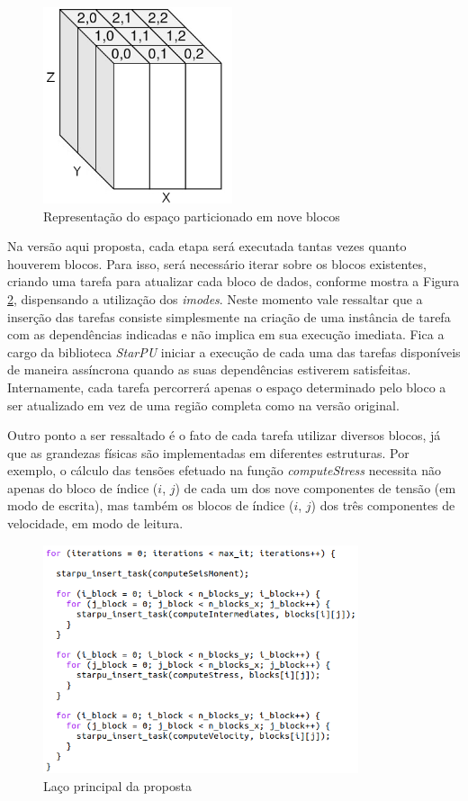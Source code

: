 \documentclass[cic,tc]{iiufrgs}
\begin{document}
\begin{figure}[!htb]
    \caption{Representação do espaço particionado em nove blocos}
    \begin{center}
      \includegraphics[width=15em]{cuboids}
    \end{center}
    \label{fig:cuboids}
\end{figure}

Na versão aqui proposta, cada etapa será executada tantas vezes quanto houverem blocos. Para isso, será necessário iterar sobre os blocos existentes, criando uma tarefa para atualizar cada bloco
de dados, conforme mostra a Figura \ref{fig:new_main_loop}, dispensando a utilização dos \textit{imodes}. Neste momento vale ressaltar que a inserção das tarefas consiste
simplesmente na criação de uma instância de tarefa com as dependências indicadas e não implica em sua execução imediata. Fica a cargo da biblioteca \textit{StarPU} iniciar a execução
de cada uma das tarefas disponíveis de maneira assíncrona quando as suas dependências estiverem satisfeitas. Internamente, cada tarefa percorrerá apenas o espaço determinado pelo bloco a ser
atualizado em vez de uma região completa como na versão original.

Outro ponto a ser ressaltado é o fato de cada tarefa utilizar diversos blocos, já que as grandezas físicas são implementadas em diferentes estruturas. Por exemplo, o cálculo das
tensões efetuado na função \textit{computeStress} necessita não apenas do bloco de índice ($i$, $j$) de cada um dos nove componentes de tensão (em modo de escrita), mas também os blocos de
índice ($i$, $j$) dos três componentes de velocidade, em modo de leitura.

\begin{figure}[!htb]
    \caption{Laço principal da proposta}
    \begin{center}
      \includegraphics[width=25em]{new_main_loop}
    \end{center}
    \label{fig:new_main_loop}
\end{figure}
\end{document}
